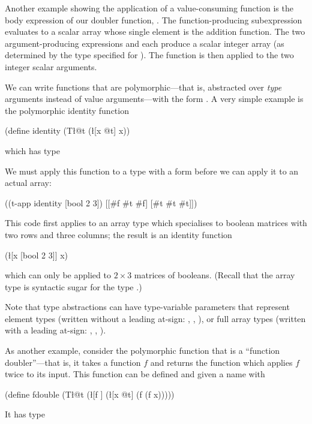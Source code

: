 Another example showing the application of a value-consuming function
is the body expression of our doubler function, .
The function-producing subexpression \ex{+} evaluates to a
scalar array whose single element is the addition function.
The two argument-producing expressions  and  each produce
a scalar integer array
(as determined by the type specified for ).
The function is then applied to the two integer scalar arguments.

We can write functions that are polymorphic---that is, abstracted
over \emph{type} arguments instead of value arguments---with the
form .
A very simple example is the polymorphic identity function
\begin{code}
(define identity (T\l{@t}
                   (\l{[x @t]} x))\end{code}
which has type
\begin{code}
\end{code}

We must apply this function to a type with a  form before
we can apply it to an actual array:
\begin{code}
((t-app identity [bool 2 3]) [[#f #t #f]
                              [#t #t #t]])\end{code}
This code first applies  to an array type which
specialises  to boolean matrices with two rows and three
columns;
the result is an identity function 
\begin{code}
(\l{[x [bool 2 3]]} x)\end{code}
which can only be applied to $2\times 3$ matrices of booleans.
(Recall that the array type \ex{[bool 2 3]} is syntactic sugar for
the type
.)

Note that type abstractions can have type-variable parameters
that represent element types
(written without a leading at-sign: , , \etc),
or full array types
(written with a leading at-sign: , , \etc).
                              
As another example, consider the polymorphic function that is a
``function doubler''---that is, it takes a function $f$ and
returns the function which applies $f$ twice to its input.
This function can be defined and given a name with
\begin{code}
(define fdouble (T\l{@t}
                  (\l{[f ]}
                    (\l{[x @t]} (f (f x)))))\end{code}
It has type
\begin{code}
\end{code}

